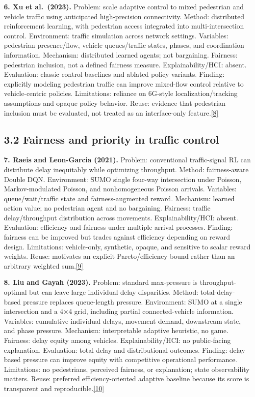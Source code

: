 \documentclass[
  english,
  11pt,
  a4paper,
]{article}
\begin{document}
\textbf{6. Xu et al.~(2023).} Problem: scale adaptive control to mixed
pedestrian and vehicle traffic using anticipated high-precision
connectivity. Method: distributed reinforcement learning, with
pedestrian access integrated into multi-intersection control.
Environment: traffic simulation across network settings. Variables:
pedestrian presence/flow, vehicle queues/traffic states, phases, and
coordination information. Mechanism: distributed learned agents; not
bargaining. Fairness: pedestrian inclusion, not a defined fairness
measure. Explainability/HCI: absent. Evaluation: classic control
baselines and ablated policy variants. Finding: explicitly modeling
pedestrian traffic can improve mixed-flow control relative to
vehicle-centric policies. Limitations: reliance on 6G-style
localization/tracking assumptions and opaque policy behavior. Reuse:
evidence that pedestrian inclusion must be evaluated, not treated as an
interface-only feature.\hyperref[source-8]{[8]}

\subsection{3.2 Fairness and priority in traffic
control}\label{fairness-and-priority-in-traffic-control}

\textbf{7. Raeis and Leon-Garcia (2021).} Problem: conventional
traffic-signal RL can distribute delay inequitably while optimizing
throughput. Method: fairness-aware Double DQN. Environment: SUMO single
four-way intersection under Poisson, Markov-modulated Poisson, and
nonhomogeneous Poisson arrivals. Variables: queue/wait/traffic state and
fairness-augmented reward. Mechanism: learned action value; no
pedestrian agent and no bargaining. Fairness: traffic delay/throughput
distribution across movements. Explainability/HCI: absent. Evaluation:
efficiency and fairness under multiple arrival processes. Finding:
fairness can be improved but trades against efficiency depending on
reward design. Limitations: vehicle-only, synthetic, opaque, and
sensitive to scalar reward weights. Reuse: motivates an explicit
Pareto/efficiency bound rather than an arbitrary weighted
sum.\hyperref[source-9]{[9]}

\textbf{8. Liu and Gayah (2023).} Problem: standard max-pressure is
throughput-optimal but can leave large individual delay disparities.
Method: total-delay-based pressure replaces queue-length pressure.
Environment: SUMO at a single intersection and a 4×4 grid, including
partial connected-vehicle information. Variables: cumulative individual
delays, movement demand, downstream state, and phase pressure.
Mechanism: interpretable adaptive heuristic, no game. Fairness: delay
equity among vehicles. Explainability/HCI: no public-facing explanation.
Evaluation: total delay and distributional outcomes. Finding:
delay-based pressure can improve equity with competitive operational
performance. Limitations: no pedestrians, perceived fairness, or
explanation; state observability matters. Reuse: preferred
efficiency-oriented adaptive baseline because its score is transparent
and reproducible.\hyperref[source-10]{[10]}
\end{document}
